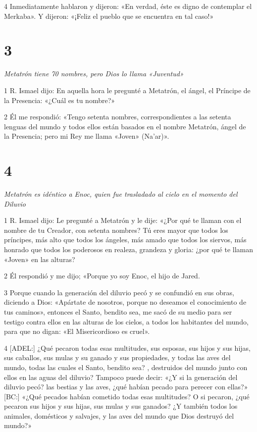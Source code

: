 \par 4 Inmediatamente hablaron y dijeron: «En verdad, éste es digno de contemplar el Merkaba». Y dijeron: «¡Feliz el pueblo que se encuentra en tal caso!»

\chapter{3}

\par \textit{Metatrón tiene 70 nombres, pero Dios lo llama «Juventud»}

\par 1 R. Ismael dijo: En aquella hora le pregunté a Metatrón, el ángel, el Príncipe de la Presencia: «¿Cuál es tu nombre?»

\par 2 Él me respondió: «Tengo setenta nombres, correspondientes a las setenta lenguas del mundo y todos ellos están basados ​​en el nombre Metatrón, ángel de la Presencia; pero mi Rey me llama «Joven» (Na'ar)».

\chapter{4}

\par \textit{Metatrón es idéntico a Enoc, quien fue trasladado al cielo en el momento del Diluvio}

\par 1 R. Ismael dijo: Le pregunté a Metatrón y le dije: «¿Por qué te llaman con el nombre de tu Creador, con setenta nombres? Tú eres mayor que todos los príncipes, más alto que todos los ángeles, más amado que todos los siervos, más honrado que todos los poderosos en realeza, grandeza y gloria: ¿por qué te llaman «Joven» en las alturas?

\par 2 Él respondió y me dijo; «Porque yo soy Enoc, el hijo de Jared.

\par 3 Porque cuando la generación del diluvio pecó y se confundió en sus obras, diciendo a Dios: «Apártate de nosotros, porque no deseamos el conocimiento de tus caminos», entonces el Santo, bendito sea, me sacó de su medio para ser testigo contra ellos en las alturas de los cielos, a todos los habitantes del mundo, para que no digan: «El Misericordioso es cruel».

\par 4 [ADEL:] ¿Qué pecaron todas esas multitudes, sus esposas, sus hijos y sus hijas, sus caballos, sus mulas y su ganado y sus propiedades, y todas las aves del mundo, todas las cuales el Santo, bendito sea? , destruidos del mundo junto con ellos en las aguas del diluvio? Tampoco puede decir: «¿Y si la generación del diluvio pecó? las bestias y las aves, ¿qué habían pecado para perecer con ellas?» [BC:] «¿Qué pecados habían cometido todas esas multitudes? O si pecaron, ¿qué pecaron sus hijos y sus hijas, sus mulas y sus ganados? ¿Y también todos los animales, domésticos y salvajes, y las aves del mundo que Dios destruyó del mundo?»


